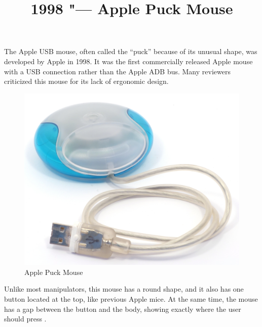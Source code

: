 \documentclass[11pt, a4paper]{article}
\begin{document}
\title{1998 "--- Apple Puck Mouse}
\date{}
\maketitle
{}
The Apple USB mouse, often called the “puck” because of its unusual shape, was developed by Apple in 1998. It was the first commercially released Apple mouse with a USB connection rather than the Apple ADB bus. Many reviewers criticized this mouse for its lack of ergonomic design.

\begin{figure}[h]
    \centering
    \includegraphics[scale=0.8]{1998_apple_puck/apple60.jpg}
    \caption{Apple Puck Mouse}
    \label{fig:pic}
\end{figure}

Unlike most manipulators, this mouse has a round shape, and it also has one button located at the top, like previous Apple mice. At the same time, the mouse has a gap between the button and the body, showing exactly where the user should press \cite{Apple}.
\end{document}
